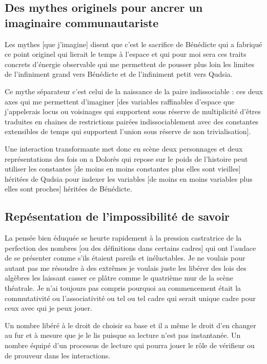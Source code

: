 \documentclass{article}
\begin{document}
\subsection{Des mythes originels pour ancrer un imaginaire communautariste}
Les mythes [que j'imagine] disent que c'est le sacrifice de Bénédicte qui a fabriqué ce point originel qui lierait le temps à l'espace et qui pour moi
sera ces traits concrets d'énergie observable qui me permettent de pousser plus loin les limites de l'infiniment grand vers Bénédicte et de l'infiniment petit vers Qudsia. 

Ce mythe séparateur c'est celui de la naissance de la paire indissociable : ces deux axes qui me permettent d'imaginer [des variables raffinables d'espace que j'appelerais locus ou voisinages qui supportent sous réserve de multiplicité d'êtres traduites en chaines de restrictions pairées indissociablement avec des constantes extensibles de temps qui supportent l'union sous réserve de  non trivialisation].     

Une interaction transformante met donc en scène deux personnages et deux représentations des fois on a Dolorès qui repose sur le poids de l'histoire peut utiliser les constantes [de moins en moins constantes plus elles sont vieilles] héritées de Qudsia pour indexer les variables [de moins en moins variables plus elles sont proches] héritées de Bénédicte.

\subsection{ Repésentation de l'impossibilité de savoir}

La pensée bien éduquée se heurte rapidement à la pression castratrice de la perfection des nombres [ou des définitions dans certains cadres] qui ont l'audace de se présenter comme s'ils étaient pareils et inéluctables. Je ne voulais pour autant pas me résoudre à des extrêmes  je voulais juste les libérer des lois des algèbres les laissant casser ce plâtre comme le quatrième mur de la scène théatrale. Je n'ai toujours pas compris pourquoi au commencement était la commutativité ou l'associativité  ou tel ou tel cadre qui serait unique cadre pour ceux avec qui je peux jouer.

Un nombre libéré à le droit de choisir sa base et il a même le droit d'en changer au fur et à mesure que je le lis puisque sa lecture n'est pas instantanée. Un nombre équipé d'un processus de lecture qui pourra jouer le rôle de  vérifieur ou de prouveur dans les interactions. 
\end{document}
